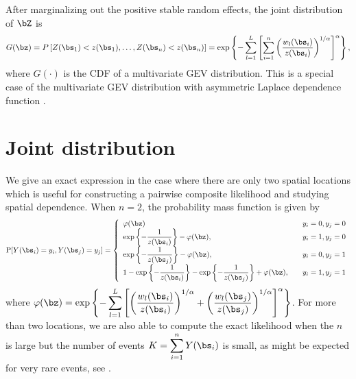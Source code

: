 After marginalizing out the positive stable random effects, the joint distribution of $\bZ$ is
\begin{align}\label{rbeq:jointCDF}
  G(\bz) = P\left[Z(\bs_1) < z(\bs_1), \ldots, Z(\bs_n) < z(\bs_n)\right] = \exp\left\{-\sum_{l=1}^L\left[\sum_{i=1}^n\left(\frac{w_{l}(\bs_i)}{z(\bs_i)}\right)^{1/\alpha}\right]^{\alpha}\right\},
\end{align}
where $G(\cdot)$ is the CDF of a multivariate GEV distribution.
This is a special case of the multivariate GEV distribution with asymmetric Laplace dependence function \citep{Tawn1990}.



\section{Joint distribution}\label{rbs:multivariate}
We give an exact expression in the case where there are only two spatial locations which is useful for constructing a pairwise composite likelihood \citep{Padoan2010} and studying spatial dependence.
When $n = 2$, the probability mass function is given by
\begin{align} \label{rbeq:biv}
  \text{P}[Y(\bs_i) = y_i, Y(\bs_j) = y_j] = \left\{ \begin{array}{ll}
    \varphi(\bz) &y_i = 0, y_j = 0\\
    \exp\left\{ - \displaystyle \frac{ 1 }{ z(\bs_i) } \right\} - \varphi(\bz), &y_i = 1, y_j = 0 \\
    \exp\left\{ - \displaystyle \frac{ 1 }{ z(\bs_j) } \right\} - \varphi(\bz), &y_i = 0, y_j = 1 \\
    1 - \exp\left\{ - \displaystyle\frac{ 1 }{ z(\bs_i) } \right\} - \exp \left\{ -\displaystyle \frac{ 1 }{z(\bs_j)} \right\} + \varphi(\bz), \quad &y_i = 1, y_j = 1
  \end{array} \right.
\end{align}
where $\varphi(\bz) = \exp \left\{ - \displaystyle \sum_{ l = 1 }^{ L } \left[ \left( \displaystyle \frac{ w_{ l }(\bs_i) }{ z(\bs_i) } \right)^{1/\alpha} + \left( \displaystyle \frac{ w_{l }(\bs_j)}{z(\bs_j)} \right)^{1/\alpha} \right]^{\alpha} \right\}$.
For more than two locations, we are also able to compute the exact likelihood when the $n$ is large but the number of events $K = \displaystyle \sum_{i = 1}^n Y(\bs_i)$ is small, as might be expected for very rare events, see .

